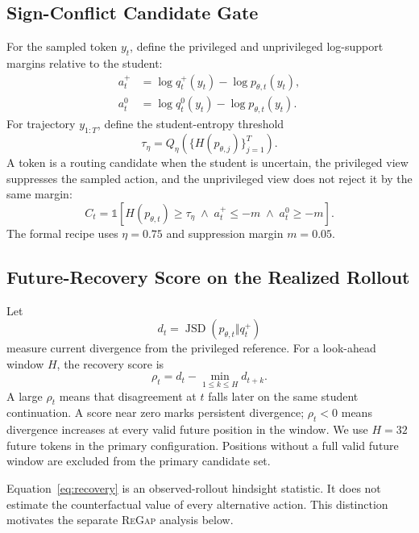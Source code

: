 \documentclass[letterpaper]{article}
\newcommand{\ReGap}{\textsc{ReGap}}
\newcommand{\JSD}{\operatorname{JSD}}
\newcommand{\Ind}{\mathbb{1}}
\begin{document}
\subsection{Sign-Conflict Candidate Gate}

For the sampled token $y_t$, define the privileged and unprivileged log-support
margins relative to the student:
\begin{align}
a_t^+ &= \log q_t^+(y_t)-\log p_{\theta,t}(y_t),\\
a_t^0 &= \log q_t^0(y_t)-\log p_{\theta,t}(y_t).
\end{align}
For trajectory $y_{1:T}$, define the student-entropy threshold
\begin{equation}
\tau_\eta=Q_\eta\!\left(\{H(p_{\theta,j})\}_{j=1}^{T}\right).
\end{equation}
A token is a routing candidate when the student is uncertain, the privileged
view suppresses the sampled action, and the unprivileged view does not reject
it by the same margin:
\begin{equation}
C_t=\Ind\!\left[
H(p_{\theta,t})\geq \tau_\eta
\;\land\;a_t^+\leq -m
\;\land\;a_t^0\geq -m
\right].
\label{eq:candidate}
\end{equation}
The formal recipe uses $\eta=0.75$ and suppression margin $m=0.05$.

\subsection{Future-Recovery Score on the Realized Rollout}

Let
\begin{equation}
d_t=\JSD(p_{\theta,t}\Vert q_t^+)
\end{equation}
measure current divergence from the privileged reference. For a look-ahead window
$H$, the recovery score is
\begin{equation}
\rho_t=d_t-\min_{1\leq k\leq H}d_{t+k}.
\label{eq:recovery}
\end{equation}
A large $\rho_t$ means that disagreement at $t$ falls later on the same student
continuation. A score near zero marks persistent divergence; $\rho_t<0$ means
divergence increases at every valid future position in the window. We use
$H=32$ future tokens in the primary configuration. Positions without a full
valid future window are excluded from the primary candidate set.

Equation~\ref{eq:recovery} is an observed-rollout hindsight statistic. It does
not estimate the counterfactual value of every alternative action. This
distinction motivates the separate \ReGap{} analysis below.
\end{document}
